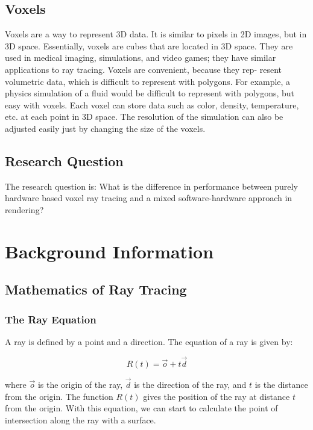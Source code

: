 \documentclass[12pt]{article}
\begin{document}
\subsection{Voxels}

Voxels are a way to represent 3D data. It is similar to pixels in 2D images,
but in 3D space. Essentially, voxels are cubes that are located in 3D space.
They are used in medical imaging, simulations, and video games; they have
similar applications to ray tracing. Voxels are convenient, because they rep-
resent volumetric data, which is difficult to represent with polygons. For
example, a physics simulation of a fluid would be difficult to represent with
polygons, but easy with voxels. Each voxel can store data such as color,
density, temperature, etc. at each point in 3D space. The resolution of the
simulation can also be adjusted easily just by changing the size of the voxels.

\subsection{Research Question}

The research question is: What is the difference in performance between
purely hardware based voxel ray tracing and a mixed software-hardware approach in rendering?

\section{Background Information}

\subsection{Mathematics of Ray Tracing}
\subsubsection{The Ray Equation}

A ray is defined by a point and a direction. The equation of a ray is given by:

\begin{equation}
    R(t) = \vec{o} + t\vec{d}
\end{equation}

where $\vec{o}$ is the origin of the ray, $\vec{d}$ is the direction of the ray, and $t$ is the distance from the origin.
The function $R(t)$ gives the position of the ray at distance $t$ from the origin.
With this equation, we can start to calculate the point of intersection along the ray with a surface.
\end{document}
